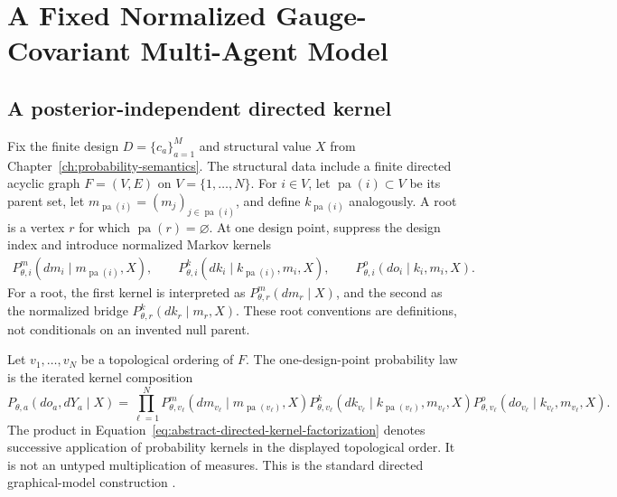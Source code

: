 \chapter{A Fixed Normalized Gauge-Covariant Multi-Agent Model}
\label{ch:generative-model}

\section{A posterior-independent directed kernel}

Fix the finite design \(D=\{c_a\}_{a=1}^{M}\) and structural value \(X\) from Chapter~\ref{ch:probability-semantics}. The structural data include a finite directed acyclic graph \(F=(V,E)\) on \(V=\{1,\ldots,N\}\). For \(i\in V\), let \(\operatorname{pa}(i)\subset V\) be its parent set, let \(m_{\operatorname{pa}(i)}=(m_j)_{j\in\operatorname{pa}(i)}\), and define \(k_{\operatorname{pa}(i)}\) analogously. A root is a vertex \(r\) for which \(\operatorname{pa}(r)=\varnothing\). At one design point, suppress the design index and introduce normalized Markov kernels
\begin{align}
P_{\theta,i}^{m}(dm_i\mid m_{\operatorname{pa}(i)},X),
\qquad
P_{\theta,i}^{k}(dk_i\mid k_{\operatorname{pa}(i)},m_i,X),
\qquad
P_{\theta,i}^{o}(do_i\mid k_i,m_i,X).
\label{eq:abstract-directed-kernels}
\end{align}
For a root, the first kernel is interpreted as \(P_{\theta,r}^{m}(dm_r\mid X)\), and the second as the normalized bridge \(P_{\theta,r}^{k}(dk_r\mid m_r,X)\). These root conventions are definitions, not conditionals on an invented null parent.

Let \(v_1,\ldots,v_N\) be a topological ordering of \(F\). The one-design-point probability law is the iterated kernel composition
\begin{equation}
P_{\theta,a}(do_a,dY_a\mid X)
=\prod_{\ell=1}^{N}
P_{\theta,v_\ell}^{m}(dm_{v_\ell}\mid m_{\operatorname{pa}(v_\ell)},X)
P_{\theta,v_\ell}^{k}(dk_{v_\ell}\mid k_{\operatorname{pa}(v_\ell)},m_{v_\ell},X)
P_{\theta,v_\ell}^{o}(do_{v_\ell}\mid k_{v_\ell},m_{v_\ell},X).
\label{eq:abstract-directed-kernel-factorization}
\end{equation}
The product in Equation~\eqref{eq:abstract-directed-kernel-factorization} denotes successive application of probability kernels in the displayed topological order. It is not an untyped multiplication of measures. This is the standard directed graphical-model construction \citep{Lauritzen1996,Wainwright2008}.

